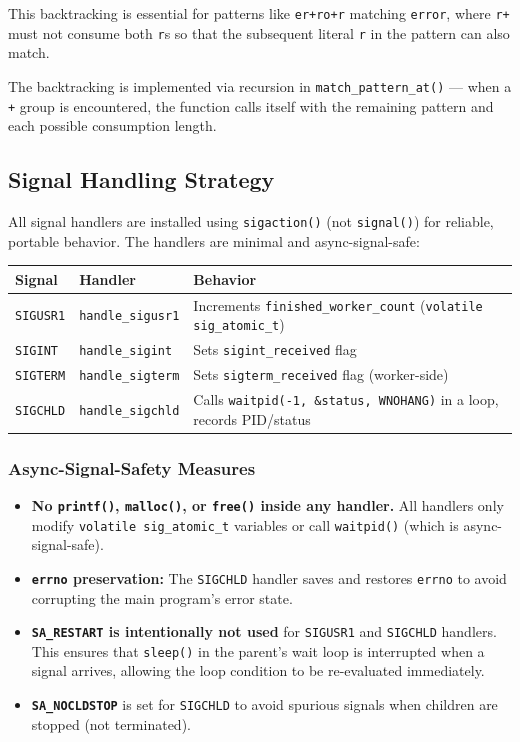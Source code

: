 \documentclass[12pt,a4paper]{article}
\begin{document}
This backtracking is essential for patterns like \texttt{er+ro+r} matching \texttt{error}, where \texttt{r+} must not consume both \texttt{r}s so that the subsequent literal \texttt{r} in the pattern can also match.

The backtracking is implemented via recursion in \texttt{match\_pattern\_at()} --- when a \texttt{+} group is encountered, the function calls itself with the remaining pattern and each possible consumption length.

\subsection{Signal Handling Strategy}

All signal handlers are installed using \texttt{sigaction()} (not \texttt{signal()}) for reliable, portable behavior. The handlers are minimal and async-signal-safe:

\begin{table}[h]
\centering
\begin{tabular}{@{}llp{7.5cm}@{}}
\toprule
\textbf{Signal} & \textbf{Handler} & \textbf{Behavior} \\
\midrule
\texttt{SIGUSR1} & \texttt{handle\_sigusr1} & Increments \texttt{finished\_worker\_count} (\texttt{volatile sig\_atomic\_t}) \\
\texttt{SIGINT}  & \texttt{handle\_sigint}  & Sets \texttt{sigint\_received} flag \\
\texttt{SIGTERM} & \texttt{handle\_sigterm} & Sets \texttt{sigterm\_received} flag (worker-side) \\
\texttt{SIGCHLD} & \texttt{handle\_sigchld} & Calls \texttt{waitpid(-1, \&status, WNOHANG)} in a loop, records PID/status \\
\bottomrule
\end{tabular}
\end{table}

\subsubsection{Async-Signal-Safety Measures}

\begin{itemize}[noitemsep]
    \item \textbf{No \texttt{printf()}, \texttt{malloc()}, or \texttt{free()} inside any handler.} All handlers only modify \texttt{volatile sig\_atomic\_t} variables or call \texttt{waitpid()} (which is async-signal-safe).
    \item \textbf{\texttt{errno} preservation:} The \texttt{SIGCHLD} handler saves and restores \texttt{errno} to avoid corrupting the main program's error state.
    \item \textbf{\texttt{SA\_RESTART} is intentionally not used} for \texttt{SIGUSR1} and \texttt{SIGCHLD} handlers. This ensures that \texttt{sleep()} in the parent's wait loop is interrupted when a signal arrives, allowing the loop condition to be re-evaluated immediately.
    \item \textbf{\texttt{SA\_NOCLDSTOP}} is set for \texttt{SIGCHLD} to avoid spurious signals when children are stopped (not terminated).
\end{itemize}
\end{document}
